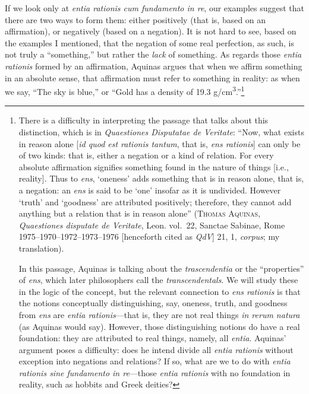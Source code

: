 \documentclass[
  12pt,
]{memoir}
\begin{document}
If we look only at \emph{entia rationis cum fundamento in re}, our
examples suggest that there are two ways to form them: either positively
(that is, based on an affirmation), or negatively (based on a negation).
It is not hard to see, based on the examples I mentioned, that the
negation of some real perfection, as such, is not truly a ``something,''
but rather the \emph{lack} of something. As regards those \emph{entia
rationis} formed by an affirmation, Aquinas argues that when we affirm
something in an absolute sense, that affirmation must refer to something
in reality: as when we say, ``The sky is blue,'' or ``Gold has a density
of 19.3 g/cm\textsuperscript{3}.''\footnote{There is a difficulty in
  interpreting the passage that talks about this distinction, which is
  in \emph{Quaestiones Disputatae de Veritate}: ``Now, what exists in
  reason alone {[}\emph{id quod est rationis tantum}, that is, \emph{ens
  rationis}{]} can only be of two kinds: that is, either a negation or a
  kind of relation. For every absolute affirmation signifies something
  found in the nature of things {[}i.e., reality{]}. Thus to \emph{ens},
  `oneness' adds something that is in reason alone, that is, a negation:
  an \emph{ens} is said to be `one' insofar as it is undivided. However
  `truth' and `goodness' are attributed positively; therefore, they
  cannot add anything but a relation that is in reason alone''
  (\textsc{Thomas Aquinas}, \emph{Quaestiones disputate de Veritate},
  Leon. vol.~22, Sanctae Sabinae, Rome 1975--1970--1972--1973--1976
  {[}henceforth cited as \emph{QdV}{]} 21, 1, \emph{corpus}; my
  translation).

  In this passage, Aquinas is talking about the \emph{trascendentia} or
  the ``properties'' of \emph{ens}, which later philosophers call the
  \emph{transcendentals}. We will study these in the logic of the
  concept, but the relevant connection to \emph{ens rationis} is that
  the notions conceptually distinguishing, say, oneness, truth, and
  goodness from \emph{ens} are \emph{entia rationis}---that is, they are
  not real things \emph{in rerum natura} (as Aquinas would say).
  However, those distinguishing notions do have a real foundation: they
  are attributed to real things, namely, all \emph{entia}. Aquinas'
  argument poses a difficulty: does he intend divide all \emph{entia
  rationis} without exception into negations and relations? If so, what
  are we to do with \emph{entia rationis sine fundamento in re}---those
  \emph{entia rationis} with no foundation in reality, such as hobbits
  and Greek deities?

}
\end{document}
